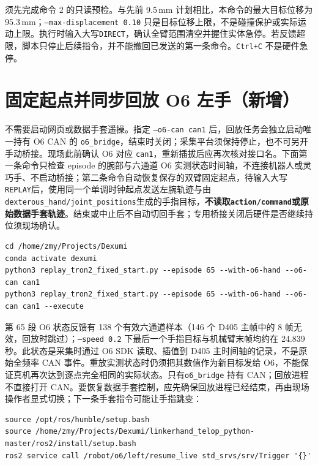 \documentclass[UTF8,a4paper,11pt]{ctexart}
\begin{document}
须先完成命令 2 的只读预检。与先前 9.5\,mm 计划相比，本命令的最大目标位移为 95.3\,mm；\texttt{--max-displacement 0.10} 只是目标位移上限，不是碰撞保护或实际运动上限。执行时输入大写\texttt{DIRECT}，确认全臂范围清空并握住实体急停。若反馈超限，脚本只停止后续指令，并不能撤回已发送的第一条命令。\texttt{Ctrl+C} 不是硬件急停。

\section*{固定起点并同步回放 O6 左手（新增）}

不需要启动网页或数据手套遥操。指定 \texttt{--o6-can can1} 后，回放任务会独立启动唯一持有 O6 CAN 的 \texttt{o6\_bridge}，结束时关闭；采集平台须保持停止，也不可另开手动桥接。现场此前确认 O6 对应 \texttt{can1}，重新插拔后应再次核对接口名。下面第一条命令只检查 episode 的腕部与六通道 O6 实测状态时间轴，不连接机器人或灵巧手、不启动桥接；第二条命令自动恢复保存的双臂固定起点，待输入大写\texttt{REPLAY}后，使用同一个单调时钟起点发送左腕轨迹与由\texttt{dexterous\_hand/joint\_positions}生成的手指目标，\textbf{不读取\texttt{action/command}或原始数据手套轨迹}。结束或中止后不自动切回手套；专用桥接关闭后硬件是否继续持位须现场确认。

\begin{verbatim}
cd /home/zmy/Projects/Dexumi
conda activate dexumi
python3 replay_tron2_fixed_start.py --episode 65 --with-o6-hand --o6-can can1
python3 replay_tron2_fixed_start.py --episode 65 --with-o6-hand --o6-can can1 --execute
\end{verbatim}

第 65 段 O6 状态反馈有 138 个有效六通道样本（146 个 D405 主帧中的 8 帧无效，回放时跳过）；\texttt{--speed 0.2} 下最后一个手指目标与机械臂末帧均约在 24.839 秒。此状态是采集时通过 O6 SDK 读取、插值到 D405 主时间轴的记录，不是原始全频率 CAN 事件。重放实测状态时仍须把其数值作为新目标发给 O6，不能保证真机再次达到逐点完全相同的实际状态。只有\texttt{o6\_bridge} 持有 CAN；回放进程不直接打开 CAN。要恢复数据手套控制，应先确保回放进程已经结束，再由现场操作者显式切换；下一条手套指令可能让手指跳变：

\begin{verbatim}
source /opt/ros/humble/setup.bash
source /home/zmy/Projects/Dexumi/linkerhand_telop_python-master/ros2/install/setup.bash
ros2 service call /robot/o6/left/resume_live std_srvs/srv/Trigger '{}'
\end{verbatim}
\end{document}

